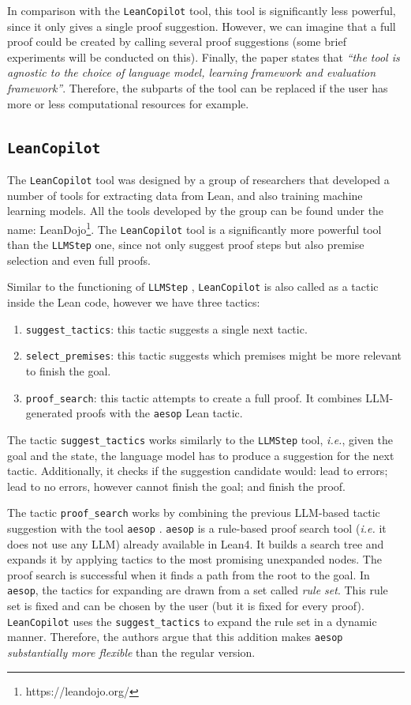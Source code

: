 \documentclass[12pt]{article}
\newcommand{\leancopilot}{\texttt{LeanCopilot} }
\newcommand{\llmstep}{\texttt{LLMStep} }
\begin{document}
In comparison with the \leancopilot tool, this tool is significantly less powerful, since it only gives a single proof suggestion. However, we can imagine that a full proof could be created by calling several proof suggestions (some brief experiments will be conducted on this). Finally, the paper states that \textit{``the tool is agnostic to the choice of language model, learning framework and evaluation framework''}. Therefore, the subparts of the tool can be replaced if the user has more or less computational resources for example.

\subsection{\leancopilot}

The \leancopilot tool \cite{leancopilot} was designed by a group of researchers that developed a number of tools for extracting data from Lean, and also training machine learning models. All the tools developed by the group can be found under the name: LeanDojo\footnote{https://leandojo.org/}. The \leancopilot tool is a significantly more powerful tool than the \llmstep one, since not only suggest proof steps but also premise selection and even full proofs.

Similar to the functioning of \llmstep, \leancopilot is also called as a tactic inside the Lean code, however we have three tactics:

\begin{enumerate}[label=(\arabic*)]
  \item \texttt{suggest\_tactics}: this tactic suggests a single next tactic.
  \item \texttt{select\_premises}: this tactic suggests which premises might be more relevant to finish the goal.
  \item \texttt{proof\_search}: this tactic attempts to create a full proof. It combines LLM-generated proofs with the \texttt{aesop} Lean tactic.
\end{enumerate}

The tactic \texttt{suggest\_tactics} works similarly to the \llmstep tool, \emph{i.e.}, given the goal and the state, the language model has to produce a suggestion for the next tactic. Additionally, it checks if the suggestion candidate would: lead to errors; lead to no errors, however cannot finish the goal; and finish the proof. 

The tactic \texttt{proof\_search} works by combining the previous LLM-based tactic suggestion with the tool \texttt{aesop} . \texttt{aesop} is a rule-based proof search tool (\emph{i.e.} it does not use any LLM) already available in Lean4. It builds a search tree and expands it by applying tactics to the most promising unexpanded nodes. The proof search is successful when it finds a path from the root to the goal. In \texttt{aesop}, the tactics for expanding are drawn from a set called \textit{rule set}. This rule set is fixed and can be chosen by the user (but it is fixed for every proof). \leancopilot uses the \texttt{suggest\_tactics} to expand the rule set in a dynamic manner. Therefore, the authors argue that this addition makes \texttt{aesop} \textit{substantially more flexible} than the regular version. 
\end{document}

